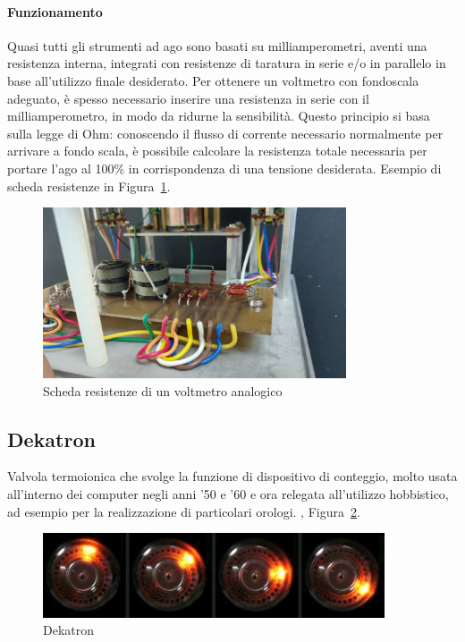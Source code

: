 \documentclass[12pt,a4paper]{report}
\begin{document}
\paragraph{Funzionamento}
Quasi tutti gli strumenti ad ago sono basati su milliamperometri, aventi una resistenza interna, integrati con resistenze di taratura
in serie e/o in parallelo in base all'utilizzo finale desiderato. Per ottenere un voltmetro con fondoscala adeguato, è spesso necessario
inserire una resistenza in serie con il milliamperometro, in modo da ridurne la sensibilità.
Questo principio si basa sulla legge di Ohm: conoscendo il flusso di corrente necessario normalmente per arrivare a fondo scala, è
possibile calcolare la resistenza totale necessaria per portare l'ago al 100\% in corrispondenza di una tensione desiderata.
Esempio di scheda resistenze in Figura~\ref{fig:schedaresistenze}.

\begin{figure}[h]
  \centering
  \includegraphics[width=0.8\textwidth]{schedaresistenze}
  \caption{Scheda resistenze di un voltmetro analogico}
  \label{fig:schedaresistenze}
\end{figure}


\subsection{Dekatron}
Valvola termoionica che svolge la funzione di dispositivo di conteggio, molto usata all'interno dei computer negli anni '50 e '60 e ora
relegata all'utilizzo hobbistico, ad esempio per la realizzazione di particolari orologi. \cite{itwiki:118300354}, Figura~\ref{fig:dekatron}.

\begin{figure}[h]
  \centering
  \includegraphics[width=0.9\textwidth]{dekatron}
  \caption{Dekatron \cite{itwiki:118300354}}
  \label{fig:dekatron}
\end{figure}
\end{document}
